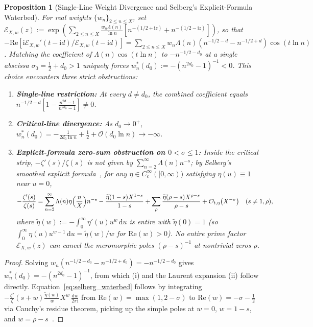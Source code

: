 \documentclass[11pt,reqno]{amsart}
\newtheorem{proposition}[theorem]{Proposition}
\theoremstyle{definition}
\theoremstyle{remark}
\numberwithin{equation}{section}
\newcommand{\dd}{\mathrm{d}}
\newcommand{\ii}{\mathrm{i}}
\newcommand{\Rea}{\mathrm{Re}}
\begin{document}
\begin{proposition}[Single-Line Weight Divergence and Selberg's Explicit-Formula Waterbed]\label{prop:waterbed}
For real weights $\{w_n\}_{2 \le n \le X}$, set $\mathcal{E}_{X,w}(z) := \exp(\sum_{2 \le n \le X} \frac{w_n\Lambda(n)}{\ln n}[n^{-(1/2+\ii z)} + n^{-(1/2-\ii z)}])$, so that $-\Rea[\ii\mathcal{E}_{X,w}'(t-\ii d)/\mathcal{E}_{X,w}(t-\ii d)] = \sum_{2 \le n \le X} w_n\Lambda(n)(n^{-1/2-d} - n^{-1/2+d})\cos(t\ln n)$. Matching the coefficient of $\Lambda(n)\cos(t\ln n)$ to $-n^{-1/2-d_0}$ at a single abscissa $\sigma_0 = \frac{1}{2} + d_0 > 1$ uniquely forces $w_n^*(d_0) := -(n^{2d_0} - 1)^{-1} < 0$. This choice encounters three strict obstructions:
\begin{enumerate}[label=\textup{(\roman*)},leftmargin=2.2em]
\item \textbf{Single-line restriction:} At every $d \ne d_0$, the combined coefficient equals $n^{-1/2-d}[1 - \frac{n^{2d}-1}{n^{2d_0}-1}] \ne 0$.
\item \textbf{Critical-line divergence:} As $d_0 \to 0^+$, $w_n^*(d_0) = -\frac{1}{2d_0\ln n} + \frac{1}{2} + \mathcal{O}(d_0\ln n) \to -\infty$.
\item \textbf{Explicit-formula zero-sum obstruction on $0 < \sigma \le 1$:} Inside the critical strip, $-\zeta'(s)/\zeta(s)$ is not given by $\sum_{n=2}^{\infty} \Lambda(n)n^{-s}$; by Selberg's smoothed explicit formula~\cite{selberg1946}, for any $\eta \in C_c^{\infty}([0, \infty))$ satisfying $\eta(u) \equiv 1$ near $u = 0$,
\begin{equation}\label{eq:selberg_waterbed}
-\frac{\zeta'(s)}{\zeta(s)} = \sum_{n=2}^{\infty} \Lambda(n)\eta\Bigl(\frac{n}{X}\Bigr)n^{-s} - \frac{\widetilde{\eta}(1-s)X^{1-s}}{1-s} + \sum_{\rho} \frac{\widetilde{\eta}(\rho - s)X^{\rho - s}}{\rho - s} + \mathcal{O}_{t,\eta}\bigl(X^{-\sigma}\bigr) \quad (s \ne 1, \rho),
\end{equation}
where $\widetilde{\eta}(w) := -\int_0^{\infty} \eta'(u)u^w\,\dd u$ is entire with $\widetilde{\eta}(0) = 1$ (so $\int_0^{\infty} \eta(u)u^{w-1}\,\dd u = \widetilde{\eta}(w)/w$ for $\Rea(w) > 0$). No entire prime factor $\mathcal{E}_{X,w}(z)$ can cancel the meromorphic poles $(\rho - s)^{-1}$ at nontrivial zeros $\rho$.
\end{enumerate}
\end{proposition}

\begin{proof}
Solving $w_n(n^{-1/2-d_0} - n^{-1/2+d_0}) = -n^{-1/2-d_0}$ gives $w_n^*(d_0) = -(n^{2d_0}-1)^{-1}$, from which (i) and the Laurent expansion (ii) follow directly. Equation~\eqref{eq:selberg_waterbed} follows by integrating $-\frac{\zeta'}{\zeta}(s+w)\frac{\widetilde{\eta}(w)}{w}X^w\,\frac{\dd w}{2\pi\ii}$ from $\Rea(w) = \max(1, 2-\sigma)$ to $\Rea(w) = -\sigma - \frac{1}{2}$ via Cauchy's residue theorem, picking up the simple poles at $w = 0$, $w = 1 - s$, and $w = \rho - s$~\cite{selberg1946,titchmarsh1986}.
\end{proof}
\end{document}
